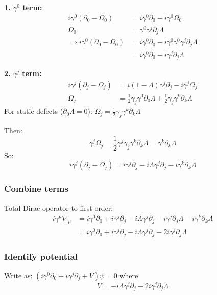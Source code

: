 \documentclass[12pt]{article}
\begin{document}
\textbf{1. $\gamma^0$ term:}
\begin{align}
    i\gamma^0 (\partial_0 - \Omega_0) &= i\gamma^0 \partial_0 - i\gamma^0 \Omega_0 \\
    \Omega_0 &= \gamma^0 \gamma^j \partial_j \Lambda \\
    \Rightarrow i\gamma^0 (\partial_0 - \Omega_0) &= i\gamma^0 \partial_0 - i\gamma^0 \gamma^0 \gamma^j \partial_j \Lambda \\
    &= i\gamma^0 \partial_0 - i\gamma^j \partial_j \Lambda
\end{align}

\textbf{2. $\gamma^j$ term:}
\begin{align}
    i\gamma^j (\partial_j - \Omega_j) &= i(1-\Lambda)\gamma^j \partial_j - i\gamma^j \Omega_j \\
    \Omega_j &= \frac{1}{2} \gamma_j \gamma^0 \partial_0 \Lambda + \frac{1}{2} \gamma_j \gamma^k \partial_k \Lambda
\end{align}
For static defects ($\partial_0 \Lambda = 0$): $\Omega_j = \frac{1}{2} \gamma_j \gamma^k \partial_k \Lambda$

Then:
\begin{equation}
    \gamma^j \Omega_j = \frac{1}{2} \gamma^j \gamma_j \gamma^k \partial_k \Lambda = \gamma^k \partial_k \Lambda
\end{equation}
So:
\begin{equation}
    i\gamma^j (\partial_j - \Omega_j) = i\gamma^j \partial_j - i\Lambda \gamma^j \partial_j - i\gamma^k \partial_k \Lambda
\end{equation}

\subsubsection{Combine terms}
Total Dirac operator to first order:
\begin{align}
    i\gamma^\mu \nabla_\mu &= i\gamma^0 \partial_0 + i\gamma^j \partial_j - i\Lambda \gamma^j \partial_j - i\gamma^j \partial_j \Lambda - i\gamma^k \partial_k \Lambda \\
    &= i\gamma^0 \partial_0 + i\gamma^j \partial_j - i\Lambda \gamma^j \partial_j - 2i\gamma^j \partial_j \Lambda
\end{align}

\subsubsection{Identify potential}
Write as: $(i\gamma^0 \partial_0 + i\gamma^j \partial_j + V)\psi = 0$ where
\begin{equation}
    V = -i\Lambda \gamma^j \partial_j - 2i\gamma^j \partial_j \Lambda
\end{equation}
\end{document}

